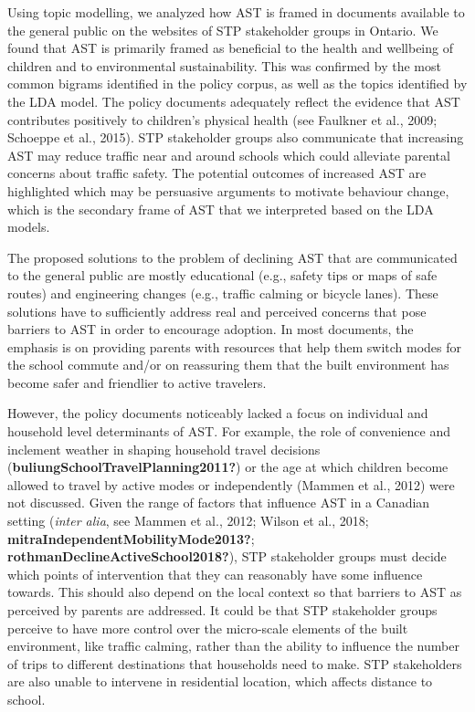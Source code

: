 \documentclass[]{elsarticle} %
\begin{document}
Using topic modelling, we analyzed how AST is framed in documents
available to the general public on the websites of STP stakeholder
groups in Ontario. We found that AST is primarily framed as beneficial
to the health and wellbeing of children and to environmental
sustainability. This was confirmed by the most common bigrams identified
in the policy corpus, as well as the topics identified by the LDA model.
The policy documents adequately reflect the evidence that AST
contributes positively to children's physical health (see Faulkner et
al., 2009; Schoeppe et al., 2015). STP stakeholder groups also
communicate that increasing AST may reduce traffic near and around
schools which could alleviate parental concerns about traffic safety.
The potential outcomes of increased AST are highlighted which may be
persuasive arguments to motivate behaviour change, which is the
secondary frame of AST that we interpreted based on the LDA models.

The proposed solutions to the problem of declining AST that are
communicated to the general public are mostly educational (e.g., safety
tips or maps of safe routes) and engineering changes (e.g., traffic
calming or bicycle lanes). These solutions have to sufficiently address
real and perceived concerns that pose barriers to AST in order to
encourage adoption. In most documents, the emphasis is on providing
parents with resources that help them switch modes for the school
commute and/or on reassuring them that the built environment has become
safer and friendlier to active travelers.

However, the policy documents noticeably lacked a focus on individual
and household level determinants of AST. For example, the role of
convenience and inclement weather in shaping household travel decisions
(\textbf{buliungSchoolTravelPlanning2011?}) or the age at which children
become allowed to travel by active modes or independently (Mammen et
al., 2012) were not discussed. Given the range of factors that influence
AST in a Canadian setting (\emph{inter alia}, see Mammen et al., 2012;
Wilson et al., 2018; \textbf{mitraIndependentMobilityMode2013?};
\textbf{rothmanDeclineActiveSchool2018?}), STP stakeholder groups must
decide which points of intervention that they can reasonably have some
influence towards. This should also depend on the local context so that
barriers to AST as perceived by parents are addressed. It could be that
STP stakeholder groups perceive to have more control over the
micro-scale elements of the built environment, like traffic calming,
rather than the ability to influence the number of trips to different
destinations that households need to make. STP stakeholders are also
unable to intervene in residential location, which affects distance to
school.
\end{document}
